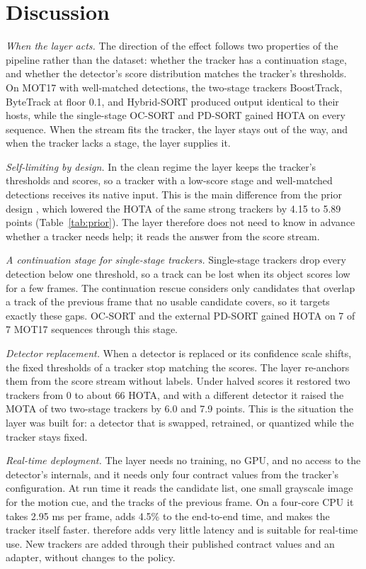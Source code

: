\section{Discussion}\label{sec:discussion}

\emph{When the layer acts.} The direction of the effect follows two
properties of the pipeline rather than the dataset: whether the tracker has a
continuation stage, and whether the detector's score distribution matches the
tracker's thresholds. On MOT17 with well-matched detections, the two-stage
trackers BoostTrack, ByteTrack at floor 0.1, and Hybrid-SORT produced output
identical to their hosts, while the single-stage OC-SORT and PD-SORT gained
HOTA on every sequence. When the stream fits the tracker, the layer stays out
of the way, and when the tracker lacks a stage, the layer supplies it.

\emph{Self-limiting by design.} In the clean regime the layer keeps the
tracker's thresholds and scores, so a tracker with a low-score stage and
well-matched detections receives its native input. This is the main
difference from the prior design \aob{}, which lowered the HOTA of the same strong
trackers by 4.15 to 5.89 points (Table~\ref{tab:prior}). The layer therefore does not
need to know in advance whether a tracker needs help; it reads the answer from
the score stream.

\emph{A continuation stage for single-stage trackers.} Single-stage trackers
drop every detection below one threshold, so a track can be lost when its
object scores low for a few frames. The continuation rescue considers only
candidates that overlap a track of the previous frame that no usable candidate
covers, so it targets exactly these gaps. OC-SORT and the external PD-SORT
gained HOTA on 7 of 7 MOT17 sequences through this stage.

\emph{Detector replacement.} When a detector is replaced or its confidence
scale shifts, the fixed thresholds of a tracker stop matching the scores. The
layer re-anchors them from the score stream without labels. Under halved
scores it restored two trackers from 0 to about 66 HOTA, and with a different
detector it raised the MOTA of two two-stage trackers by 6.0 and 7.9 points.
This is the situation the layer was built for: a detector that is swapped,
retrained, or quantized while the tracker stays fixed.

\emph{Real-time deployment.} The layer needs no training, no GPU, and no
access to the detector's internals, and it needs only four contract values
from the tracker's configuration. At run time it reads the candidate list, one
small grayscale image for the motion cue, and the tracks of the previous
frame. On a four-core CPU it takes 2.95 ms per frame, adds 4.5\% to the end-to-end time, and makes the tracker
itself faster. \scl{} therefore adds very little latency and is
suitable for real-time use. New trackers are added through their published
contract values and an adapter, without changes to the policy.
